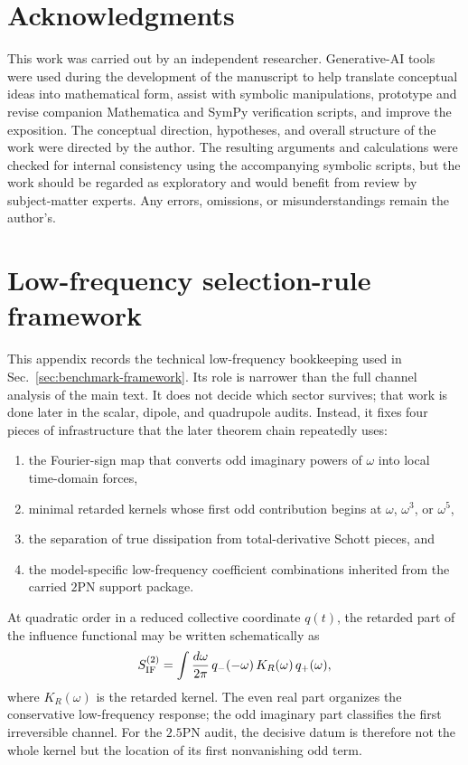 \documentclass[11pt]{article}
\begin{document}
\section*{Acknowledgments}
This work was carried out by an independent researcher. Generative-AI tools were used
during the development of the manuscript to help translate conceptual ideas into
mathematical form, assist with symbolic manipulations, prototype and revise companion
Mathematica and SymPy verification scripts, and improve the exposition. The conceptual
direction, hypotheses, and overall structure of the work were directed by the author. The
resulting arguments and calculations were checked for internal consistency using the
accompanying symbolic scripts, but the work should be regarded as exploratory and would
benefit from review by subject-matter experts. Any errors, omissions, or misunderstandings
remain the author's.

\appendix

\section{Low-frequency selection-rule framework}
\label{app:low-frequency-selection-rule-framework}

This appendix records the technical low-frequency bookkeeping used in
Sec.~\ref{sec:benchmark-framework}.  Its role is narrower than the full channel
analysis of the main text.  It does not decide which sector survives; that work
is done later in the scalar, dipole, and quadrupole audits.  Instead, it fixes
four pieces of infrastructure that the later theorem chain repeatedly uses:

\begin{enumerate}
  \item the Fourier-sign map that converts odd imaginary powers of $\omega$ into
  local time-domain forces,
  \item minimal retarded kernels whose first odd contribution begins at
  $\omega$, $\omega^3$, or $\omega^5$,
  \item the separation of true dissipation from total-derivative Schott pieces,
  and
  \item the model-specific low-frequency coefficient combinations inherited from
  the carried $2$PN support package.
\end{enumerate}

At quadratic order in a reduced collective coordinate $q(t)$, the retarded part
of the influence functional may be written schematically as
\[
S_{\rm IF}^{(2)}
=
\int \frac{d\omega}{2\pi}\,
q_-(-\omega)\,K_R(\omega)\,q_+(\omega),
\]
where $K_R(\omega)$ is the retarded kernel.  The even real part organizes the
conservative low-frequency response; the odd imaginary part classifies the first
irreversible channel.  For the $2.5$PN audit, the decisive datum is therefore
not the whole kernel but the location of its first nonvanishing odd term.
\end{document}
